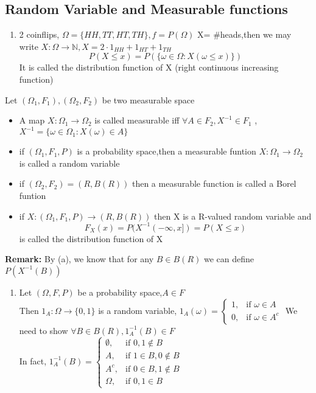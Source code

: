 \subsection{Random Variable and Measurable functions}
\begin{example}[]{}
 \begin{enumerate}[label=\circled{\arabic*}] 
 \item 2 coinflips, $\Omega=\{HH,TT,HT,TH\} ,f=P(\Omega)  $ 
 X= \#heads,then we may write $ X:\Omega\rightarrow \mathbb{N},X=2\cdot 1_{HH}+1_{HT}+1_{TH} $ 
 $$
    P(X\leq x)=P(\{\omega\in \Omega:X(\omega\leq x)\})
 $$ It is called the distribution function of X (right continuous increasing function)
 \end{enumerate}
\end{example}
\begin{definition}[]{}
Let $ (\Omega_1, F_1),(\Omega_2, F_2) $ be two measurable space
\begin{itemize}
\item A map $ X:\Omega_1\rightarrow\Omega_2 $ is called measurable iff $ \forall A \in F_2,X^{-1}\in F_1 $ , $ X^{-1}=\{\omega\in \Omega_1:X(\omega)\in A\} $ 
\item if $(\Omega_1, F_1,P)$ is a probability space,then a measurable funtion $ X:\Omega_1\rightarrow\Omega_2 $ is called a random variable
\item if $(\Omega_2, F_2) =(R,B(R))$ then a measurable function is called a Borel funtion
\item if $X:(\Omega_1, F_1,P)\rightarrow (R,B(R))$ then X is a R-valued random variable and $$
    F_X(x)=P(X^{-1}(-\infty,x])=P(X\leq x)
$$ is called the distribution function of X
\end{itemize} 
\end{definition}
\textbf{Remark:}
By (a), we know that for any $ B\in B(R) $ we can define $ P(X^{-1}(B)) $  
\begin{example}[]{}
 \begin{enumerate}[label=\circled{\arabic*}] 
 \item Let $ (\Omega, F,P) $ be a probability space,$ A\in F $ \\
 Then $ 1_A:\Omega\rightarrow \{0,1\} $ is a random variable, $ 1_A(\omega)=\begin{cases}
    1, & \text{if }\omega\in A\\
    0, & \text{if }\omega\in A^c
 \end{cases} $ 
 We need to show $ \forall B\in B(R),1_A^{-1}(B)\in F $ \\
 In fact, $1_A^{-1}(B)=\begin{cases}
    \emptyset, & \text{if }0,1\notin B\\
    A, & \text{if }1\in B,0\notin B\\
    A^c, & \text{if }0\in B,1\notin B\\
    \Omega, & \text{if }0,1\in B \end{cases}$
 \end{enumerate}
\end{example}

